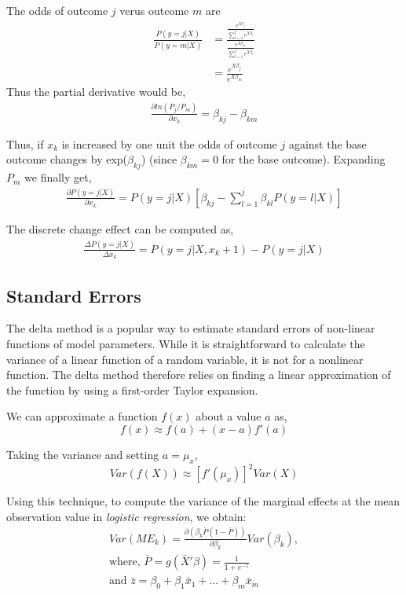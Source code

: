 The odds of outcome $j$ verus outcome $m$ are
\begin{align*}
  \frac{P(y=j | X)}{P(y=m | X)} & = \frac{\frac{e^{X\beta_j}}{\sum_{l=1}^{j} e^{X\beta_l}}}
                                       {\frac{e^{X\beta_m}}{\sum_{l=1}^{j} e^{X\beta_l}}} \\
                                & = \frac{e^{X\beta_j}}{e^{X\beta_m}}
\end{align*}
Thus the partial derivative would be,
\begin{gather*}
  \frac{\partial ln(P_j/P_m)}{\partial x_k} = \beta_{kj} - \beta_{km}
\end{gather*}

Thus, if $x_k$ is increased by one unit the odds of outcome $j$ against the
base outcome changes by exp($\beta_{kj}$) (since $\beta_{km}=0$ for the base
outcome). Expanding $P_m$ we finally get,
\begin{gather*}
  \frac{\partial P(y=j|X)}{\partial x_k} = P(y=j|X)\left[ \beta_{kj} - \sum_{l=1}^{j}\beta_{kl} P(y=l|X) \right]
\end{gather*}

The discrete change effect can be computed as,
\begin{gather*}
  \frac{\Delta P(y=j|X)}{\Delta x_k} = P(y=j|X, x_k+1) - P(y=j|X)
\end{gather*}

\subsection{Standard Errors} %
\label{sub:standard_errors}
The delta method is a popular way to estimate standard errors of non-linear
functions of model parameters. While it is straightforward to calculate the
variance of a linear function of a random variable, it is not for a nonlinear
function. The delta method therefore relies on finding a linear approximation
of the function by using a first-order Taylor expansion.

We can approximate a function $f(x)$ about a value $a$ as,
\[
  f(x) \approx f(a) + (x-a)f'(a)
\]

Taking the variance and setting $a = \mu_x$,
\[
  Var(f(X)) \approx \left[f'(\mu_x)\right]^2 Var(X)
\]

Using this technique, to compute the variance of the marginal effects at the
mean observation value in \emph{logistic regression}, we obtain:
\begin{gather*}
  Var(ME_k) = \frac{\partial (\beta_k \bar{P} (1- \bar{P}))}{\partial \beta_k} Var(\beta_k),\\
  \text{where, } \bar{P} = g(\bar{X}' \beta) = \frac{1}{1 + e^{-\bar{z}}} \\
  \text{and }    \bar{z} = \beta_0 + \beta_1 \bar{x}_1 + \dots + \beta_m \bar{x}_m
\end{gather*}

